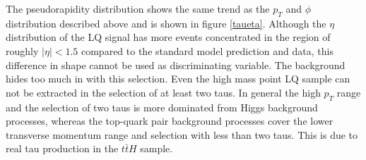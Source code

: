 %
The pseudorapidity distribution shows the same trend as the $p_T$ and $\phi$ distribution described above and is shown in figure \ref{taueta}. Although the $\eta$ distribution of the LQ signal has more events concentrated in the region of roughly $|\eta|<1.5$ compared to the standard model prediction and data, this difference in shape cannot be used as discriminating variable. The background hides too much in with this selection. Even the high mass point LQ sample can not be extracted in the selection of at least two taus. In general the high $p_T$ range and the selection of two taus is more dominated from Higgs background processes, whereas the top-quark pair background processes cover the lower transverse momentum range and selection with less than two taus. This is due to real tau production in the $t\bar{t}H$ sample. \par
%
